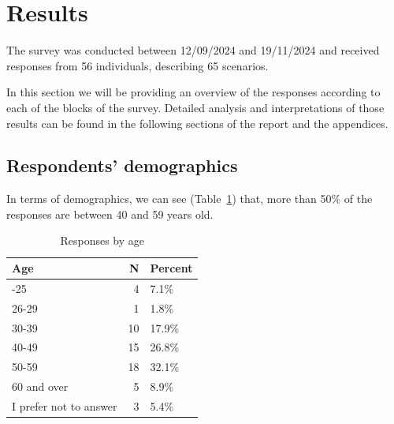 \documentclass[
  a4paper,
]{book}
\begin{document}

\section{Results}\label{results}

The survey was conducted between 12/09/2024 and 19/11/2024 and received
responses from 56 individuals, describing 65 scenarios.

In this section we will be providing an overview of the responses
according to each of the blocks of the survey. Detailed analysis and
interpretations of those results can be found in the following sections
of the report and the appendices.

\subsection{Respondents' demographics}\label{respondents-demographics}

In terms of demographics, we can see (Table~\ref{tbl-responses-age})
that, more than 50\% of the responses are between 40 and 59 years old.

\begin{longtable}[]{@{}lrl@{}}

\caption{\label{tbl-responses-age}Responses by age}

\tabularnewline

\toprule\noalign{}
Age & N & Percent \\
\midrule\noalign{}
\endhead
\bottomrule\noalign{}
\endlastfoot
20-25 & 4 & 7.1\% \\
26-29 & 1 & 1.8\% \\
30-39 & 10 & 17.9\% \\
40-49 & 15 & 26.8\% \\
50-59 & 18 & 32.1\% \\
60 and over & 5 & 8.9\% \\
I prefer not to answer & 3 & 5.4\% \\

\end{longtable}
\end{document}
